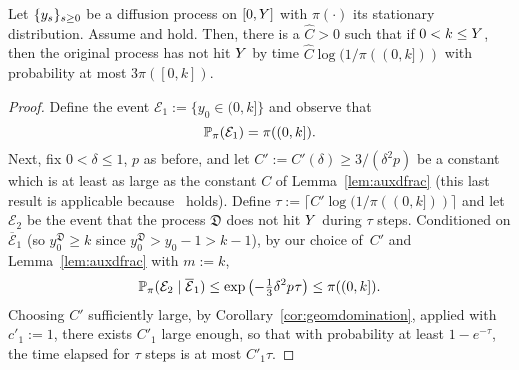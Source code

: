 \begin{lemma}\label{lem:coupling}
	Let $\{y_s\}_{s\geq 0}$ be a diffusion process on 
	$[0,Y]$ with $\pi(\cdot)$ its stationary distribution.
	Assume  and  hold.
	Then, there is a %
	$\widehat{C} >0$ such that if $0<k\le Y$, then
	the original process has not hit $Y$
	by time $\widehat{C}\log(1/\pi((0,k]))$ with probability at most $3\pi([0,k])$.
\end{lemma}
\begin{proof}
Define the event $\mathcal{E}_1:=\{y_0\in (0,k]\}$ and observe that
\begin{equation*}\label{mixed:lower:E1Bnd}
\mathbb{P}_{\pi}(\mathcal{E}_1) = \pi((0, k]).
\end{equation*}
Next, fix $0 <\delta \leq 1$, $p$ as before, and let $C':=C'(\delta)\geq 3/(\delta^2p)$ 
be a constant which is at least as large as the 
constant $C$ of Lemma~\ref{lem:auxdfrac} (this last result is applicable because~ holds).
Define $\tau:=\lceil C'\log(1/\pi((0,k]))\rceil$ and
let~$\mathcal{E}_2$ be the event that the process $\mathfrak{D}$ does not hit $Y$ during $\tau$ steps.
Conditioned on $\overline{\mathcal{E}}_1$ (so $y_0^{\mathfrak{D}}\geq k$ since $y_0^{\mathfrak{D}}>y_0-1>k-1$), by our choice of~$C'$ and Lemma~\ref{lem:auxdfrac} with $m:=k$,
\begin{equation*}\label{mixed:lower:E2Bnd}
\mathbb{P}_{\pi}(\mathcal{E}_2 \mid \overline{\mathcal{E}}_1) 
\leq \exp\big({-}\tfrac13\delta^2p_{}\tau\big) 
\leq \pi((0,k]).
\end{equation*}
Choosing $C'$ sufficiently large, by Corollary~\ref{cor:geomdomination}, applied with $c'_1:=1$, there exists $C'_1$ large enough, so that with probability at least $1-e^{-\tau}$, the time elapsed for $\tau$ steps is at most $C'_1 \tau$.

\begin{comment}
Next, since \linktomycom{hyp:H2} holds, for the random variable $T_m$ and the constant $L$ therein, by Markov's inequality, with probability at most $1/2<1$, the original process exits $(m-1,m]$ before time $2 L$. Formally, for any integer $1\leq m\leq \auxY$ and $y_0\in (m-1,m]$, we have $\PP_{\auxy_0}(T_m\ge 2 L) \leq 1/2$\cml{I added here a proposal for the argument I was thinking about, I think it is simpler so see if you like it}\dmc{I agree, it is shorter}.


\end{comment}
\end{proof}
